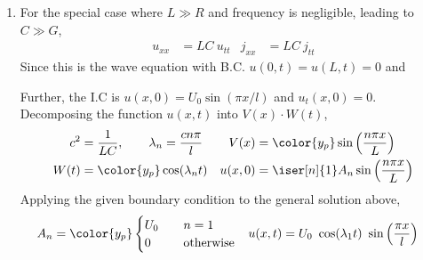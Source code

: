 \begin{enumerate}
\begin{enumerate}
              \item For the special case where $ L \gg R $ and frequency
                    is negligible, leading to $ C \gg G $,
                    \begin{align}
                        u_{xx} & = LC\ u_{tt} &
                        j_{xx} & = LC\ j_{tt}
                    \end{align}
                    Since this is the wave equation with B.C. $ u(0, t)
                        = u(L, t) = 0$ and \par
                    Further, the I.C is $ u(x, 0) = U_0 \sin(\pi x/l) $ and
                    $ u_t(x, 0) = 0 $.
                    Decomposing the function $ u(x, t) $ into $ V(x) \cdot W(t)$,
                    \begin{align}
                        c^2     & = \frac{1}{LC}, \qquad \lambda_n = \frac{cn\pi}{l} &
                        V(x)    & = \color{y_p}\sin\Big( \frac{n\pi x}{L} \Big)        \\
                        W(t)    & = \color{y_p}\cos(\lambda_n t)                     &
                        u(x, 0) & = \iser[n]{1} A_n \sin\Big( \frac{n\pi x}{L} \Big)
                    \end{align}
                    Applying the given boundary condition to the general solution above,
                    \begin{align}
                        A_n     & = \color{y_p} \begin{cases}
                                                    U_0 & \quad n = 1            \\
                                                    0   & \quad \text{otherwise}
                                                \end{cases}                     &
                        u(x, t) & = U_0\ \cos(\lambda_1 t)\ \sin\Big( \frac{\pi x}{l}
                        \Big)
                    \end{align}
          \end{enumerate}


\end{enumerate}

